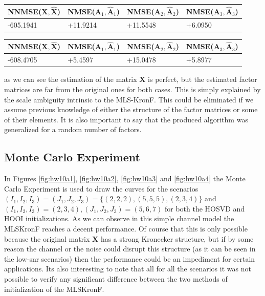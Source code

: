 \documentclass[a4paper,10pt]{article}
\begin{document}
    \begin{table}[ht!]
        \centering
        \begin{tabular}{|l|l|l|l|}
        \hline
        NNMSE($\boldsymbol{X}, \boldsymbol{\hat{X}}$) & NMSE($\boldsymbol{A}_{1}, \boldsymbol{\hat{A}}_{1}$) & NMSE($\boldsymbol{A}_{2}, \boldsymbol{\hat{A}}_{2}$) & NMSE($\boldsymbol{A}_{3}, \boldsymbol{\hat{A}}_{3}$) \\ \hline
        -605.1941 & +11.9214 & +11.5548 & +6.0950 \\ \hline
        \end{tabular}
    \end{table}

    \begin{table}[ht!]
        \centering
        \begin{tabular}{|l|l|l|l|}
        \hline
        NNMSE($\boldsymbol{X}, \boldsymbol{\hat{X}}$) & NMSE($\boldsymbol{A}_{1}, \boldsymbol{\hat{A}}_{1}$) & NMSE($\boldsymbol{A}_{2}, \boldsymbol{\hat{A}}_{2}$) & NMSE($\boldsymbol{A}_{3}, \boldsymbol{\hat{A}}_{3}$) \\ \hline
        -608.4705 & +5.4597 & +15.0478 & +5.8977 \\ \hline
        \end{tabular}
    \end{table}

    as we can see the estimation of the matrix $\boldsymbol{X}$ is perfect, but the estimated factor matrices are far from the original ones for both cases. This is simply explained by 
    the scale ambiguity intrinsic to the MLS-KronF. This could be eliminated if we assume previous knowledge of either the structure of the factor matrices or some of their elements.
    It is also important to say that the produced algorithm was generalized for a random number of factors.

    \subsection*{Monte Carlo Experiment}

    In Figures \ref{fig:hw10a1}, \ref{fig:hw10a2}, \ref{fig:hw10a3} and \ref{fig:hw10a4} the Monte Carlo Experiment is used to draw the curves for the scenarios 
    $(I_{1},I_{2},I_{3}) = (J_{1},J_{2},J_{3}) = \{(2,2,2), (5,5,5), (2,3,4)\}$ and $(I_{1},I_{2},I_{3}) = (2,3,4), (J_{1},J_{2},J_{3}) = (5,6,7)$ for both the HOSVD and HOOI initializations. 
    As we can observe in  this simple channel model the MLSKronF reaches a decent performance. Of course that this is only possible because the original matrix $\boldsymbol{X}$ has a strong 
    Kronecker structure, but if by some reason the channel or the noise could disrupt this structure (as it can be seen in the low-snr scenarios) then the performance could be an impediment for certain applications.
    Its also interesting to note that all for all the scenarios it was not possible to verify any significant difference between the two methods of initialization of the MLSKronF.
\end{document}
